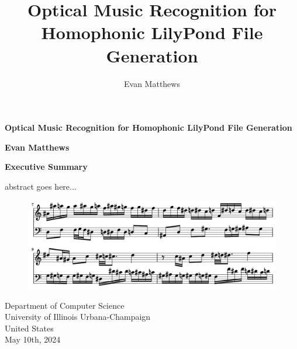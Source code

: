 \documentclass[review,sigconf]{acmart}
\newcommand{\todo}[1]{\textcolor{red}{TODO: #1}}
\begin{document}
\begin{titlepage}
    \begin{center}
        \vspace*{1cm}
            
        \Huge
        \textbf{Optical Music Recognition for Homophonic LilyPond File Generation}
            
        \vspace{0.5cm}
        \LARGE
            
        \vspace{0.5cm}
            
        \textbf{Evan Matthews}

        \vspace{0.9cm}
		\textbf{Executive Summary}

		\vspace{0.5cm}
		abstract goes here...

		\begin{figure}
			\centering
			\includegraphics[width = .8\linewidth]{./figures/cover.png}
		\end{figure}

        \vfill
            
        \vspace{0.8cm}
            
        \Large
        Department of Computer Science\\
        University of Illinois Urbana-Champaign\\
        United States\\
        May 10th, 2024
            
    \end{center}
\end{titlepage}

\title[omr-lilypond-midi]{Optical Music Recognition for Homophonic LilyPond File Generation}
\author{Evan Matthews}

\end{document}
